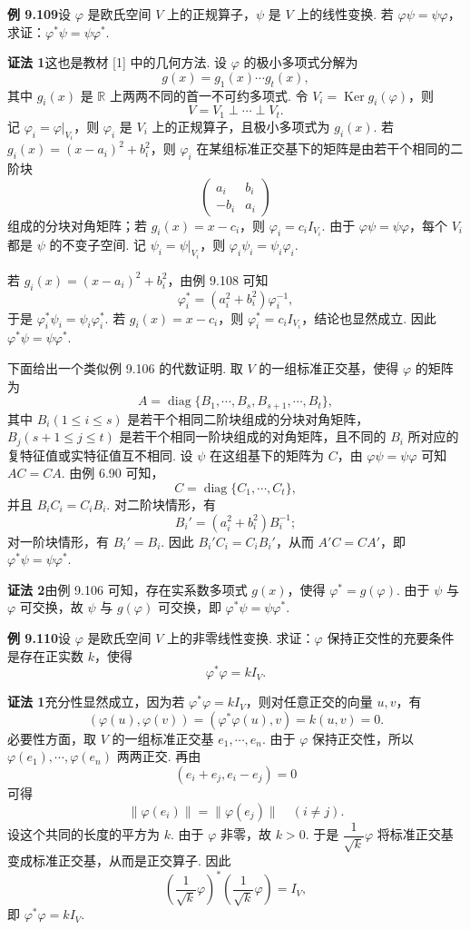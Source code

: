 \documentclass[UTF8,12pt,a4paper,fontset=fandol]{ctexart}
\begin{document}
\noindent\textbf{例 9.109}\quad 设 $\varphi$ 是欧氏空间 $V$ 上的正规算子，$\psi$ 是 $V$ 上的线性变换. 若 $\varphi\psi=\psi\varphi$，求证：$\varphi^*\psi=\psi\varphi^*$.

\noindent\textbf{证法 1}\quad 这也是教材 [1] 中的几何方法. 设 $\varphi$ 的极小多项式分解为
\[
g(x)=g_1(x)\cdots g_t(x),
\]
其中 $g_i(x)$ 是 $\mathbb{R}$ 上两两不同的首一不可约多项式. 令 $V_i=\operatorname{Ker} g_i(\varphi)$，则
\[
V=V_1\perp\cdots\perp V_t.
\]
记 $\varphi_i=\varphi|_{V_i}$，则 $\varphi_i$ 是 $V_i$ 上的正规算子，且极小多项式为 $g_i(x)$. 若 $g_i(x)=(x-a_i)^2+b_i^2$，则 $\varphi_i$ 在某组标准正交基下的矩阵是由若干个相同的二阶块
\[
\begin{pmatrix}
a_i&b_i\\
-b_i&a_i
\end{pmatrix}
\]
组成的分块对角矩阵；若 $g_i(x)=x-c_i$，则 $\varphi_i=c_iI_{V_i}$. 由于 $\varphi\psi=\psi\varphi$，每个 $V_i$ 都是 $\psi$ 的不变子空间. 记 $\psi_i=\psi|_{V_i}$，则 $\varphi_i\psi_i=\psi_i\varphi_i$.

若 $g_i(x)=(x-a_i)^2+b_i^2$，由例 9.108 可知
\[
\varphi_i^*=(a_i^2+b_i^2)\varphi_i^{-1},
\]
于是 $\varphi_i^*\psi_i=\psi_i\varphi_i^*$. 若 $g_i(x)=x-c_i$，则 $\varphi_i^*=c_iI_{V_i}$，结论也显然成立. 因此 $\varphi^*\psi=\psi\varphi^*$.

下面给出一个类似例 9.106 的代数证明. 取 $V$ 的一组标准正交基，使得 $\varphi$ 的矩阵为
\[
A=\operatorname{diag}\{B_1,\cdots,B_s,B_{s+1},\cdots,B_t\},
\]
其中 $B_i(1\le i\le s)$ 是若干个相同二阶块组成的分块对角矩阵，$B_j(s+1\le j\le t)$ 是若干个相同一阶块组成的对角矩阵，且不同的 $B_i$ 所对应的复特征值或实特征值互不相同. 设 $\psi$ 在这组基下的矩阵为 $C$，由 $\varphi\psi=\psi\varphi$ 可知 $AC=CA$. 由例 6.90 可知，
\[
C=\operatorname{diag}\{C_1,\cdots,C_t\},
\]
并且 $B_iC_i=C_iB_i$. 对二阶块情形，有
\[
B_i'=(a_i^2+b_i^2)B_i^{-1};
\]
对一阶块情形，有 $B_i'=B_i$. 因此 $B_i'C_i=C_iB_i'$，从而 $A'C=CA'$，即 $\varphi^*\psi=\psi\varphi^*$.

\noindent\textbf{证法 2}\quad 由例 9.106 可知，存在实系数多项式 $g(x)$，使得 $\varphi^*=g(\varphi)$. 由于 $\psi$ 与 $\varphi$ 可交换，故 $\psi$ 与 $g(\varphi)$ 可交换，即 $\varphi^*\psi=\psi\varphi^*$.

\noindent\textbf{例 9.110}\quad 设 $\varphi$ 是欧氏空间 $V$ 上的非零线性变换. 求证：$\varphi$ 保持正交性的充要条件是存在正实数 $k$，使得
\[
\varphi^*\varphi=kI_V.
\]

\noindent\textbf{证法 1}\quad 充分性显然成立，因为若 $\varphi^*\varphi=kI_V$，则对任意正交的向量 $u,v$，有
\[
(\varphi(u),\varphi(v))=(\varphi^*\varphi(u),v)=k(u,v)=0.
\]
必要性方面，取 $V$ 的一组标准正交基 $e_1,\cdots,e_n$. 由于 $\varphi$ 保持正交性，所以 $\varphi(e_1),\cdots,\varphi(e_n)$ 两两正交. 再由
\[
(e_i+e_j,e_i-e_j)=0
\]
可得
\[
\|\varphi(e_i)\|=\|\varphi(e_j)\|\quad (i\ne j).
\]
设这个共同的长度的平方为 $k$. 由于 $\varphi$ 非零，故 $k>0$. 于是 $\dfrac{1}{\sqrt{k}}\varphi$ 将标准正交基变成标准正交基，从而是正交算子. 因此
\[
\left(\frac{1}{\sqrt{k}}\varphi\right)^*\left(\frac{1}{\sqrt{k}}\varphi\right)=I_V,
\]
即 $\varphi^*\varphi=kI_V$.
\end{document}
